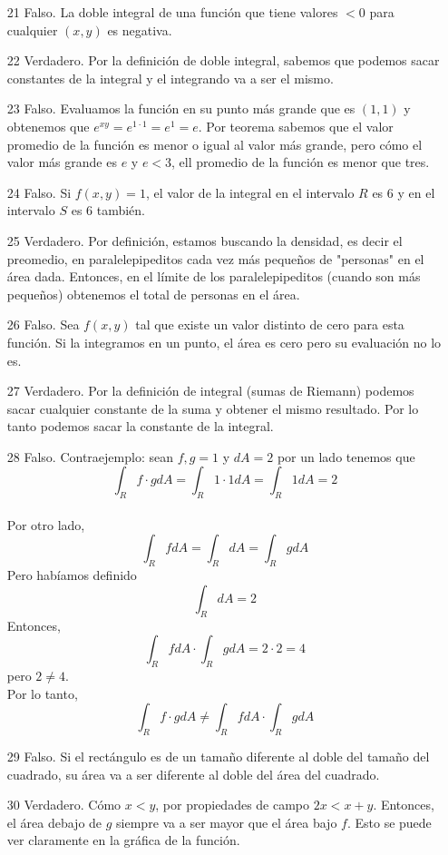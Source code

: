 \documentclass[a4paper,12pt]{article}
\begin{document}
\begin{itemize}
	\item[21] Falso. La doble integral de una función que tiene valores $< 0 $ para cualquier $(x,y)$ es negativa.
	\item[22] Verdadero. Por la definición de doble integral, sabemos que podemos sacar constantes de la integral y el integrando va a ser el mismo.
	\item[23] Falso. Evaluamos la función en su punto más grande que es $(1,1)$ y obtenemos que $e^{xy}=e^{1\cdot1}=e^1=e$. Por teorema sabemos que el valor promedio de la función es menor o igual al valor más grande, pero cómo el valor más grande es $e$ y $e < 3$, ell promedio de la función es menor que tres.
	\item[24] Falso. Si $f(x,y) = 1$, el valor de la integral en el intervalo $R$ es $6$ y en el intervalo $S$ es $6$ también.
	\item[25] Verdadero. Por definición, estamos buscando la densidad, es decir el preomedio, en paralelepipeditos cada vez más pequeños de "personas" en el área dada. Entonces, en el límite de los paralelepipeditos (cuando son más pequeños) obtenemos el total de personas en el área.
	\item[26] Falso. Sea $f(x,y)$ tal que existe un valor distinto de cero para esta función. Si la integramos en un punto, el área es cero pero su evaluación no lo es.
	\item[27] Verdadero. Por la definición de integral (sumas de Riemann) podemos sacar cualquier constante de la suma y obtener el mismo resultado. Por lo tanto podemos sacar la constante de la integral.
	\item[28] Falso. Contraejemplo: sean $f,g=1$ y $dA=2$ por un lado tenemos que \[\int_Rf\cdot g dA= \int_R 1\cdot 1 dA = \int_R 1 dA = 2\]\\
	Por otro lado, \[\int_R f dA = \int_R dA = \int_R g dA\] Pero habíamos definido \[\int_R dA = 2\] Entonces, \[\int_R f dA \cdot \int_R g dA = 2 \cdot 2 = 4\] pero $2 \neq 4$.\\
	Por lo tanto, \[\int_Rf\cdot g dA \neq \int_R f dA \cdot \int_R g dA\]
	\item[29] Falso. Si el rectángulo es de un tamaño diferente al doble del tamaño del cuadrado, su área va a ser diferente al doble del área del cuadrado.
	\item[30] Verdadero. Cómo $x < y$, por propiedades de campo $2x<x+y$. Entonces, el área debajo de $g$ siempre va a ser mayor que el área bajo $f$. Esto se puede ver claramente en la gráfica de la función.
\end{itemize}
\end{document}
